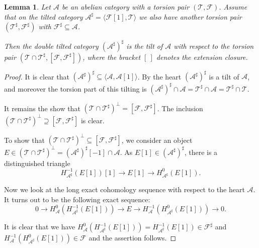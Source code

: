 \documentclass[12pt]{amsart}
\newtheorem{lemma}[theorem]{Lemma}
\theoremstyle{definition}
\begin{document}
\begin{lemma}\label{doubletilt}
Let $\mathcal{A}$ be an abelian category  with a torsion pair $(\mathcal{T},\mathcal{F})$.
Assume that on the tilted category $\mathcal{A}^\sharp = \langle \mathcal{F}[1],\mathcal{T}\rangle$ we also have another torsion pair $(\mathcal{T}^\sharp,\mathcal{F}^\sharp)$ with $\mathcal{F}^\sharp \subseteq \mathcal{A}$.

Then the double tilted category $(\mathcal{A}^\sharp)^\sharp$ is the tilt of $\mathcal{A}$ with respect to the torsion pair $(\mathcal{T}\cap \mathcal{T}^\sharp,  [\mathcal{F}, \mathcal{F}^\sharp])$, where the bracket $[ \ ]$ denotes the extension closure.
\end{lemma}
\begin{proof}
It is clear that $(\mathcal{A}^\sharp)^\sharp \subseteq \langle \mathcal{A}, \mathcal{A}[1] \rangle$.
By \cite[Lemma 1.1.2]{Pol07} the heart $(\mathcal{A}^\sharp)^\sharp$ is a tilt of $\mathcal{A}$, and moreover the torsion part of this tilting is $(\mathcal{A}^\sharp)^\sharp \cap \mathcal{A} =\mathcal{T}^\sharp\cap \mathcal{A} = \mathcal{T}^\sharp \cap\mathcal{T}$.

It remains the show that $(\mathcal{T}\cap \mathcal{T}^\sharp)^\perp = [\mathcal{F}, \mathcal{F}^\sharp]$. The inclusion $(\mathcal{T}\cap \mathcal{T}^\sharp)^\perp \supseteq [\mathcal{F}, \mathcal{F}^\sharp]$ is clear.

To show that $(\mathcal{T}\cap \mathcal{T}^\sharp)^\perp \subseteq [\mathcal{F}, \mathcal{F}^\sharp]$, we consider an object $E \in (\mathcal{T}\cap \mathcal{T}^\sharp)^\perp = (\mathcal{A}^\sharp)^\sharp[-1] \cap \mathcal{A}$.
As $E[1] \in (\mathcal{A}^\sharp)^\sharp$, there is a distinguished triangle $$ H^{-1}_{\mathcal{A}^\sharp}(E[1])[1]\longrightarrow E[1] \longrightarrow H^0_{\mathcal{A}^\sharp}(E[1]).$$

Now we look at the long exact cohomology sequence with respect to the heart $\mathcal{A}$. It turns out to be the following exact sequence:
$$ 0 \longrightarrow H^0_{\mathcal{A}}(H^{-1}_{\mathcal{A}^\sharp}(E[1])) \longrightarrow E \longrightarrow H^{-1}_{\mathcal{A}}(H^0_{\mathcal{A}^\sharp}(E[1])) \longrightarrow 0. $$

It is clear that we have $H^0_{\mathcal{A}}(H^{-1}_{\mathcal{A}^\sharp}(E[1]))=H^{-1}_{\mathcal{A}^\sharp}(E[1]) \in \mathcal{F}^\sharp$ and $H^{-1}_{\mathcal{A}}(H^0_{\mathcal{A}^\sharp}(E[1])) \in \mathcal{F}$ and the assertion follows.
\end{proof}
\end{document}
